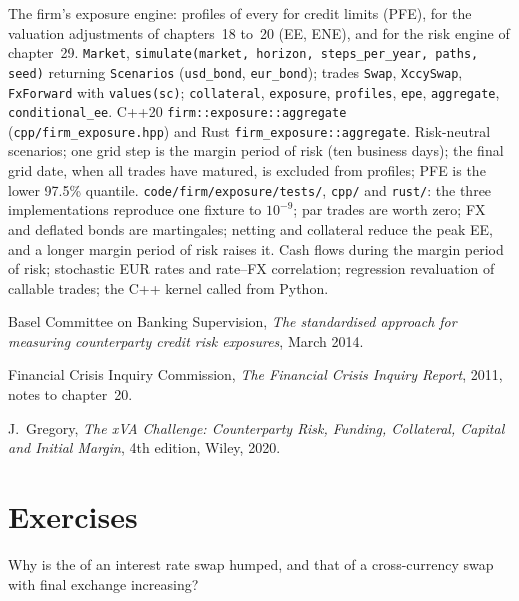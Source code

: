 \begin{build}
 The firm's exposure engine: profiles of every  for credit limits
(PFE), for the valuation adjustments of chapters~18 to~20 (EE, ENE), and for the risk
engine of chapter~29.
 \texttt{Market}, \texttt{simulate(market, horizon, steps\_per\_year,
paths, seed)} returning \texttt{Scenarios} (\texttt{usd\_bond}, \texttt{eur\_bond});
trades \texttt{Swap}, \texttt{XccySwap}, \texttt{FxForward} with \texttt{values(sc)};
\texttt{collateral}, \texttt{exposure}, \texttt{profiles}, \texttt{epe},
\texttt{aggregate}, \texttt{conditional\_ee}. C++20 \texttt{firm::exposure::aggregate}
(\texttt{cpp/firm\_exposure.hpp}) and Rust \texttt{firm\_exposure::aggregate}.
 Risk-neutral scenarios; one grid step is the margin period of risk (ten
business days); the final grid date, when all trades have matured, is excluded from
profiles; PFE is the lower 97.5\% quantile.
 \texttt{code/firm/exposure/tests/}, \texttt{cpp/} and
\texttt{rust/}: the three implementations reproduce one fixture to $10^{-9}$; par trades are
worth zero; FX and deflated bonds are martingales; netting and collateral reduce the peak
EE, and a longer margin period of risk raises it.
 Cash flows during the margin period of risk; stochastic EUR rates and
rate--FX correlation; regression revaluation of callable trades; the C++ kernel called
from Python.
\end{build}

\begin{omsources}
\item Basel Committee on Banking Supervision, \emph{The standardised approach for measuring
counterparty credit risk exposures}, March 2014.
\item Financial Crisis Inquiry Commission, \emph{The Financial Crisis Inquiry Report},
2011, notes to chapter~20.
\item J.~Gregory, \emph{The xVA Challenge: Counterparty Risk, Funding, Collateral, Capital and Initial
Margin}, 4th edition, Wiley, 2020.
\end{omsources}

\section{Exercises}

\begin{exercise}[$\star$]\label{exo:rc:counterparty-exposure:1}
Why is the  of an interest rate swap humped, and that of a cross-currency
swap with final exchange increasing?
\end{exercise}

